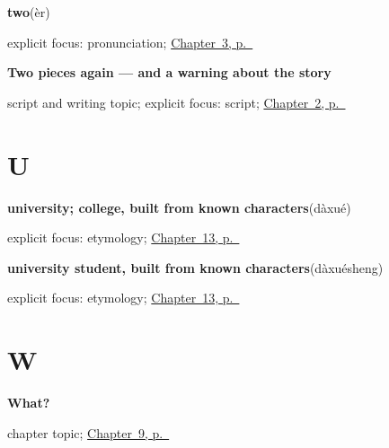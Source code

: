 \noindent\begin{minipage}[t]{\linewidth}
\raggedright
\textbf{two}\enspace\emph{}\enspace(èr)\par
\footnotesize explicit focus: pronunciation; \hyperref[ch:zh-numbers]{Chapter~3, p.~\pageref*{ch:zh-numbers}}
\end{minipage}\par\smallskip

\noindent\begin{minipage}[t]{\linewidth}
\raggedright
\textbf{Two pieces again — and a warning about the story}\par
\footnotesize script and writing topic; explicit focus: script; \hyperref[ch:zh-components]{Chapter~2, p.~\pageref*{ch:zh-components}}
\end{minipage}\par\smallskip

\section*{U}

\noindent\begin{minipage}[t]{\linewidth}
\raggedright
\textbf{university; college, built from known characters}\enspace\emph{}\enspace(dàxué)\par
\footnotesize explicit focus: etymology; \hyperref[ch:zh-school-six]{Chapter~13, p.~\pageref*{ch:zh-school-six}}
\end{minipage}\par\smallskip

\noindent\begin{minipage}[t]{\linewidth}
\raggedright
\textbf{university student, built from known characters}\enspace\emph{}\enspace(dàxuésheng)\par
\footnotesize explicit focus: etymology; \hyperref[ch:zh-school-six]{Chapter~13, p.~\pageref*{ch:zh-school-six}}
\end{minipage}\par\smallskip

\section*{W}

\noindent\begin{minipage}[t]{\linewidth}
\raggedright
\textbf{What?}\par
\footnotesize chapter topic; \hyperref[ch:zh-shenme]{Chapter~9, p.~\pageref*{ch:zh-shenme}}
\end{minipage}\par\smallskip

